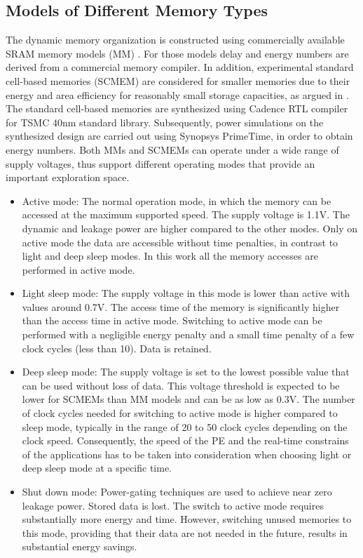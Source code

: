 \subsection{Models of Different Memory Types}
The dynamic memory organization is constructed using commercially available SRAM memory models (MM) .
For those models delay and energy numbers are derived from a commercial memory compiler.
In addition, experimental standard cell-based memories (SCMEM) \cite{Mei11}  are  considered for smaller memories due to their energy and area efficiency for reasonably small storage capacities, as argued in \cite{Mei10}. 
The standard cell-based memories are synthesized using Cadence RTL  compiler for TSMC 40nm standard library. 
Subsequently, power simulations on the synthesized design are carried out using Synopsys PrimeTime, in order to obtain energy numbers.
Both MMs and SCMEMs can operate under a wide range of supply voltages, thus support different operating modes that provide an important exploration space.
\begin{itemize}
\item Active mode: The normal operation mode, in which the memory can be accessed at the maximum supported speed. The supply voltage is 1.1V. 
The dynamic and leakage power are higher compared to the other modes.
Only on active mode the data are accessible without time penalties, in contrast to light and deep sleep modes.
In this work all the memory accesses are performed in active mode. 
\item Light sleep mode: The supply voltage in this mode is lower than active with values around 0.7V. 
The access time of the memory is significantly higher than the access time in active mode. 
Switching to active mode can be performed with a negligible energy penalty and a small time penalty of a few clock cycles (less than 10). 
Data is retained.  
\item Deep sleep mode: The supply voltage is set to the lowest possible value that can be used without loss of data. 
This voltage threshold is expected to be lower for SCMEMs than MM models and can be as low as 0.3V. 
The number of clock cycles needed for switching to active mode is higher compared to sleep mode, typically in the range of 20 to 50 clock cycles depending on the clock speed. 
Consequently, the speed of the PE and the real-time constrains of the applications has to be taken into consideration when choosing light or deep sleep mode at a specific time.  
\item Shut down mode: Power-gating techniques are used to achieve near zero leakage power. 
Stored data is lost. 
The switch to active mode requires substantially more energy and time. 
However, switching unused memories to this mode, providing that their data are not needed in the future, results in substantial energy savings.
\end{itemize}  

